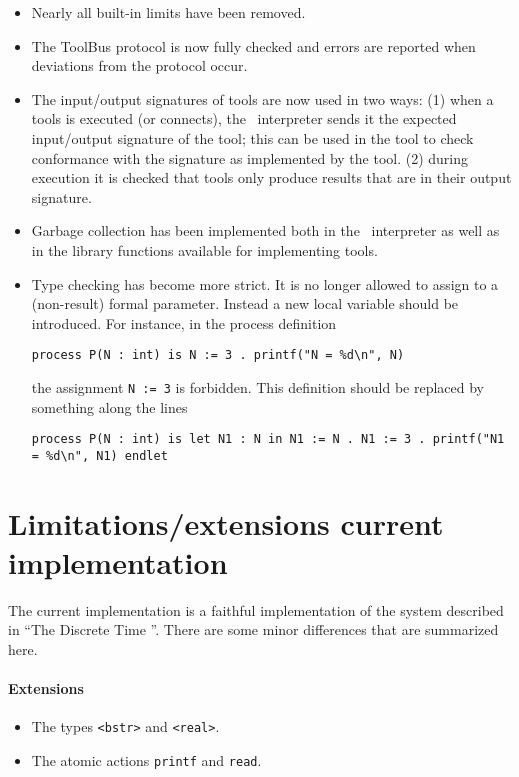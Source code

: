 \begin{itemize}
\item Nearly all built-in limits have been removed.
\item The ToolBus protocol is now fully checked and errors are reported
  when deviations from the protocol occur.
\item The input/output signatures of tools are now used in two ways:
(1) when a tools is executed (or connects), the \TB\ interpreter sends it
the expected input/output signature of the tool; this can be used in the
tool to check conformance with the signature as implemented by the tool.
(2) during execution it is checked that tools only produce results that
are in their output signature.
\item Garbage collection has been implemented both in the \TB\ interpreter
as well as in the library functions available for implementing tools.

\item Type checking has become more strict. It is no longer allowed to
assign to a (non-result) formal parameter. Instead a new local variable should be introduced.
For instance, in the process definition
\begin{verbatim}
process P(N : int) is N := 3 . printf("N = %d\n", N)
\end{verbatim}
the assignment {\tt N := 3} is forbidden. This definition should 
be replaced by something along the lines
\begin{verbatim}
process P(N : int) is let N1 : N in N1 := N . N1 := 3 . printf("N1 = %d\n", N1) endlet
\end{verbatim}
\end{itemize}

\section{Limitations/extensions current implementation}

The current implementation is a faithful implementation of the
system described in ``The Discrete Time \TB''. There are some
minor differences that are summarized here.

\paragraph{Extensions}
\begin{itemize}
\item The types {\tt <bstr>} and {\tt <real>}.
\item The atomic actions {\tt printf} and {\tt read}.
\end{itemize}

